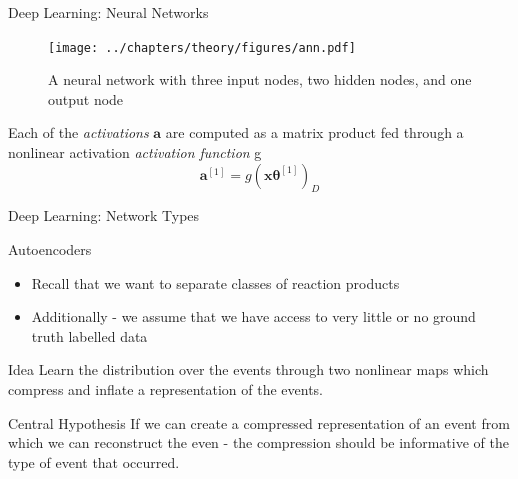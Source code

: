 \documentclass{beamer}
\begin{document}
\begin{frame}[t]{Deep Learning: Neural Networks}
	\begin{figure}[h]
		\centering
		\texttt{[image: ../chapters/theory/figures/ann.pdf]}
		\caption{A neural network with three input nodes, two hidden nodes, and one output node}
		\label{fig:ann}
	\end{figure}
	Each of the \textit{activations} $\mathbf{a}$ are computed as a matrix product fed through a nonlinear activation \textit{activation function} g
	\begin{equation}\label{eq:fwd}
		\boldsymbol{a}^{[1]} = g(\boldsymbol{x}\boldsymbol{\theta}^{[1]})_D
	\end{equation}
\end{frame}
\begin{frame}[t]{Deep Learning: Network Types}
	\begin{figure}[h]
		\centering
	\end{figure}
\end{frame}
\begin{frame}[t]{Autoencoders}
	\begin{itemize}
		\item Recall that we want to separate classes of reaction products
		\item Additionally - we assume that we have access to very little or no ground truth labelled data
	\end{itemize}
	\begin{block}{ Idea }
		Learn the distribution over the events through two nonlinear maps which compress and inflate a representation of the events.
	\end{block}
	\begin{block}{Central Hypothesis}
		If we can create a compressed representation of an event from which we can reconstruct the even - the compression should be informative of the type of event that occurred.
	\end{block}
\end{frame}
\end{document}
